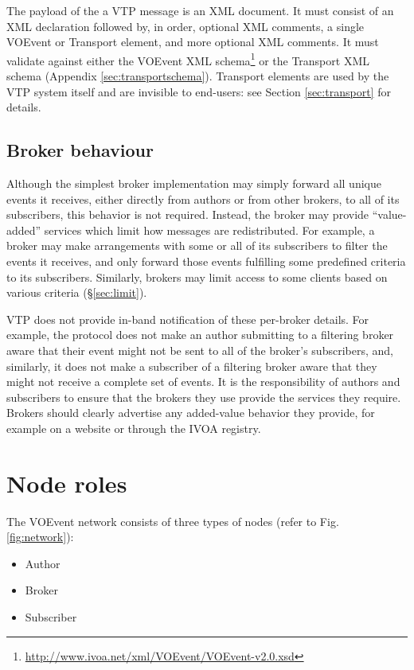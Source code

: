 \documentclass[a4paper,11pt]{ivoa}
\begin{document}
The payload of the a VTP message is an XML document. It must consist of an XML
declaration followed by, in order, optional XML comments, a single VOEvent or
Transport element, and more optional XML comments. It must validate against
either the VOEvent XML
schema\footnote{\url{http://www.ivoa.net/xml/VOEvent/VOEvent-v2.0.xsd}} or the
Transport XML schema (Appendix \ref{sec:transportschema}). Transport elements
are used by the VTP system itself and are invisible to end-users: see Section
\ref{sec:transport} for details.

\subsection{Broker behaviour}

Although the simplest broker implementation may simply forward all unique
events it receives, either directly from authors or from other brokers, to all
of its subscribers, this behavior is not required. Instead, the broker may
provide ``value-added'' services which limit how messages are redistributed.
For example, a broker may make arrangements with some or all of its
subscribers to filter the events it receives, and only forward those events
fulfilling some predefined criteria to its subscribers. Similarly, brokers may
limit access to some clients based on various criteria (\S\ref{sec:limit}).

VTP does not provide in-band notification of these per-broker details. For
example, the protocol does not make an author submitting to a filtering broker
aware that their event might not be sent to all of the broker's subscribers,
and, similarly, it does not make a subscriber of a filtering broker aware that
they might not receive a complete set of events. It is the responsibility of
authors and subscribers to ensure that the brokers they use provide the
services they require. Brokers should clearly advertise any added-value
behavior they provide, for example on a website or through the IVOA registry.

\section{Node roles}
\label{sec:noderoles}

The VOEvent network consists of three types of nodes (refer to Fig.
\ref{fig:network}):

\begin{itemize}
    \item{Author}
    \item{Broker}
    \item{Subscriber}
\end{itemize}
\end{document}
